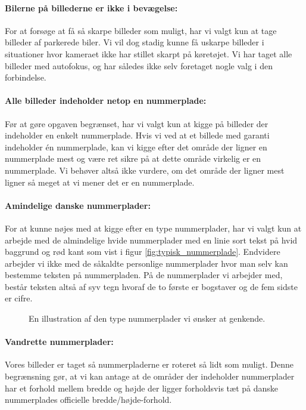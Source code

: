 \paragraph{Bilerne på billederne er ikke i bevægelse:}
For at forsøge at få så skarpe billeder som muligt, har vi valgt kun at tage billeder af parkerede biler. Vi vil dog stadig kunne få uskarpe billeder i situationer hvor kameraet ikke har stillet skarpt på køretøjet. Vi har taget alle billeder med autofokus, og har således ikke selv foretaget nogle valg i den forbindelse.

\paragraph{Alle billeder indeholder netop en nummerplade:}
Før at gøre opgaven begrænset, har vi valgt kun at kigge på billeder der indeholder en enkelt nummerplade. Hvis vi ved at et billede med garanti indeholder én nummerplade, kan vi kigge efter det område der ligner en nummerplade mest og være ret sikre på at dette område virkelig er en nummerplade. Vi behøver altså ikke vurdere, om det område der ligner mest ligner så meget at vi mener det er en nummerplade.

\paragraph{Amindelige danske nummerplader:}
For at kunne nøjes med at kigge efter en type nummerplader, har vi valgt kun at arbejde med de almindelige hvide nummerplader med en linie sort tekst på hvid baggrund og rød kant som vist i figur \vref{fig:typisk_nummerplade}. Endvidere arbejder vi ikke med de såkaldte personlige nummerplader hvor man selv kan bestemme teksten på nummerpladen. På de nummerplader vi arbejder med, består teksten altså af syv tegn hvoraf de to første er bogstaver og de fem sidste er cifre.

\begin{figure}[htp]
\centering
{} 
\caption{En illustration af den type nummerplader vi ønsker at genkende.}
\label{fig:typisk_nummerplade}
\end{figure}

\paragraph{Vandrette nummerplader:}
Vores billeder er taget så nummerpladerne er roteret så lidt som muligt. Denne begrænsning gør, at vi kan antage at de områder der indeholder nummerplader har et forhold mellem bredde og højde der ligger forholdsvis tæt på danske nummerplades officielle bredde/højde-forhold.

